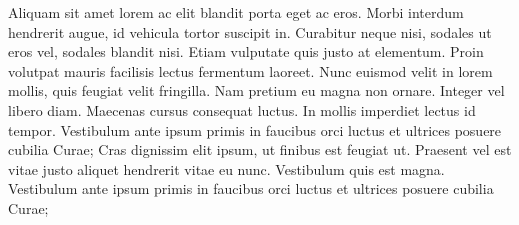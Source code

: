 Aliquam sit amet lorem ac elit blandit porta eget ac eros. Morbi interdum
hendrerit augue, id vehicula tortor suscipit in. Curabitur neque nisi,
sodales ut eros vel, sodales blandit nisi. Etiam vulputate quis justo
at elementum. Proin volutpat mauris facilisis lectus fermentum laoreet.
Nunc euismod velit in lorem mollis, quis feugiat velit fringilla.
Nam pretium eu magna non ornare. Integer vel libero diam. Maecenas
cursus consequat luctus. In mollis imperdiet lectus id tempor. Vestibulum
ante ipsum primis in faucibus orci luctus et ultrices posuere cubilia
Curae; Cras dignissim elit ipsum, ut finibus est feugiat ut. Praesent
vel est vitae justo aliquet hendrerit vitae eu nunc. Vestibulum quis
est magna. Vestibulum ante ipsum primis in faucibus orci luctus et
ultrices posuere cubilia Curae;
